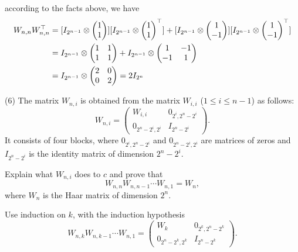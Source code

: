 \documentclass[12pt]{article}
\begin{document}
according to the facts above, we have
\begin{align*}
W_{n, n} \transpos{W_{n, n}} &= 
[I_{2^{n-1}} \tensor 
\begin{pmatrix}
1 \\
1
\end{pmatrix}]
[I_{2^{n-1}} \tensor 
\transpos{\begin{pmatrix}
1 \\
1
\end{pmatrix}
}] + 
[I_{2^{n-1}} \tensor 
\begin{pmatrix}
1 \\
-1
\end{pmatrix}]
[I_{2^{n-1}} \tensor 
\transpos{
\begin{pmatrix}
1 \\
-1
\end{pmatrix}}] \\
&=
I_{2^{n-1}} \tensor 
\begin{pmatrix}
1 &1 \\
1 &1 
\end{pmatrix} +
I_{2^{n-1}} \tensor 
\begin{pmatrix}
1 &-1 \\
-1 &1 
\end{pmatrix} \\
&= 
I_{2^{n-1}} \tensor 
\begin{pmatrix}
2 &0 \\
0 &2 
\end{pmatrix} = 
2I_{2^n} 
\end{align*}





\medskip
(6)
The matrix $W_{n, i}$ is obtained from the matrix $W_{i, i}$ 
($1 \leq i \leq n - 1$) as follows:
\[
W_{n, i} = 
\begin{pmatrix}
 W_{i, i} & 0_{2^{i}, 2^{n} - 2^{i}} \\
0_{2^{n}- 2^{i}, 2^i} & I_{2^{n} - 2^{i}}
\end{pmatrix}.
\]
It consists of four blocks,
where  $0_{2^{i}, 2^{n} - 2^{i}}$ and $0_{2^{n} - 2^{i}, 2^i}$
are matrices of zeros and $I_{2^{n} - 2^{i}}$ is the identity matrix of
dimension $2^{n} - 2^i$.

\medskip
Explain what $W_{n, i}$ does to $c$ and prove that
\[
W_{n, n} W_{n, n - 1} \cdots W_{n, 1} = W_n,
\]
where $W_n$ is the Haar matrix of dimension $2^n$.

\medskip
\hint
Use induction on $k$,  with the induction hypothesis
\[
W_{n, k} W_{n, k - 1}\cdots W_{n, 1} = 
\begin{pmatrix}
 W_{k} & 0_{2^{k}, 2^{n} - 2^{k}} \\
0_{2^{n}- 2^{k}, 2^k} &  I_{2^{n} - 2^{k}}
\end{pmatrix}.
\]
\end{document}
